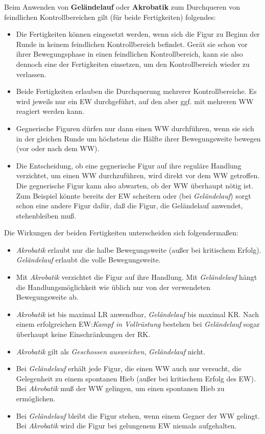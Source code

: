 \documentclass[10pt,a4paper,germanpar]{article}
\begin{document}
Beim Anwenden von \textbf{Geländelauf} oder \textbf{Akrobatik} zum
Durchqueren von feindlichen Kontrollbereichen gilt (für beide
Fertigkeiten) folgendes:
\begin{itemize}
  \item Die Fertigkeiten können eingesetzt werden, wenn sich die Figur
    zu Beginn der Runde in keinem feindlichen Kontrollbereich
    befindet. Gerät sie schon vor ihrer Bewegungsphase in einen
    feindlichen Kontrollbereich, kann sie also dennoch eine der
    Fertigkeiten einsetzen, um den Kontrollbereich wieder zu
    verlassen.
  \item Beide Fertigkeiten erlauben die Durchquerung mehrerer
    Kontrollbereiche. Es wird jeweils nur ein EW durchgeführt, auf den
    aber ggf. mit mehreren WW reagiert werden kann.
  \item Gegnerische Figuren dürfen nur dann einen WW durchführen, wenn
    sie sich in der gleichen Runde um höchstens die Hälfte ihrer
    Bewegungsweite bewegen (vor oder nach dem WW).
  \item Die Entscheidung, ob eine gegnerische Figur auf ihre reguläre
    Handlung verzichtet, um einen WW durchzuführen, wird direkt vor
    dem WW getroffen. Die gegnerische Figur kann also abwarten, ob der
    WW überhaupt nötig ist. Zum Beispiel könnte bereits der EW
    scheitern oder (bei \emph{Geländelauf}) sorgt schon eine andere
    Figur dafür, daß die Figur, die Geländelauf anwendet,
    stehenbleiben muß.
\end{itemize}
Die Wirkungen der beiden Fertigkeiten unterscheiden sich
folgendermaßen:
\begin{itemize}
  \item \emph{Akrobatik} erlaubt nur die halbe Bewegungsweite (außer
    bei kritischem Erfolg). \emph{Geländelauf} erlaubt die volle
    Bewegungsweite.
  \item Mit \emph{Akrobatik} verzichtet die Figur auf ihre Handlung.
    Mit \emph{Geländelauf} hängt die Handlungsmöglichkeit wie üblich
    nur von der verwendeten Bewegungsweite ab.
  \item \emph{Akrobatik} ist bis maximal LR anwendbar,
    \emph{Geländelauf} bis maximal KR. Nach einem erfolgreichen
    EW:\emph{Kampf in Vollrüstung} bestehen bei \emph{Geländelauf}
    sogar überhaupt keine Einschränkungen der RK.
  \item \emph{Akrobatik} gilt als \emph{Geschossen ausweichen},
    \emph{Geländelauf} nicht.
  \item Bei \emph{Geländelauf} erhält jede Figur, die einen WW auch
    nur versucht, die Gelegenheit zu einem spontanen Hieb (außer bei
    kritischem Erfolg des EW). Bei \emph{Akrobatik} muß der WW
    gelingen, um einen spontanen Hieb zu ermöglichen.
  \item Bei \emph{Geländelauf} bleibt die Figur stehen, wenn einem
    Gegner der WW gelingt. Bei \emph{Akrobatik} wird die Figur bei
    gelungenem EW niemals aufgehalten.
\end{itemize}
\end{document}
